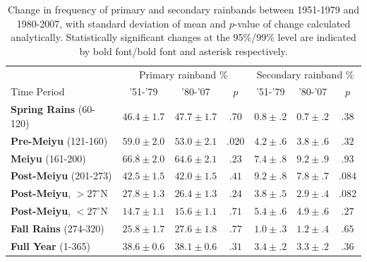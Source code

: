 \documentclass{ametsoc}
\begin{document}
\begin{table}

\centering

\caption{Change in frequency of primary and secondary rainbands between 1951-1979 and 1980-2007, with standard deviation of mean and $p$-value of change calculated analytically. Statistically significant changes at the 95\%/99\% level are indicated by bold font/bold font and asterisk respectively.}

\begin{tabular}{ l c c c c c c}
	& \multicolumn{3}{c}{Primary rainband \%} & \multicolumn{3}{c}{Secondary rainband \%} \\
	Time Period & '51-'79 & '80-'07 & $p$ & '51-'79 & '80-'07 & $p$ \\
	\hline	
	\textbf{Spring Rains} (60-120)		& $46.4 \pm 1.7$ & $47.7 \pm 1.7$ & $ .70 $ 	& $0.8 \pm .2$ & $0.7 \pm .2$ & $.38$ \\
	\textbf{Pre-Meiyu} (121-160) 		& $\boldsymbol{59.0 \pm 2.0}$ & $\boldsymbol{53.0 \pm 2.1}$ & $ \boldsymbol{.020} $ & $4.2 \pm .6$ & $3.8 \pm .6$ & $.32$ \\
	\textbf{Meiyu} (161-200)			& $66.8 \pm 2.0$ & $64.6 \pm 2.1$ & $ .23 $ 	& $7.4 \pm .8$ & $9.2 \pm .9$  & $.93$ \\
	\textbf{Post-Meiyu} (201-273)		& $42.5 \pm 1.5$ & $42.0 \pm 1.5$ & $ .41 $	& $9.2 \pm .8$ & $7.8 \pm .7$ & $.084$ \\
	\textbf{Post-Meiyu}, $>27^\circ$N 	& $27.8 \pm 1.3$ & $26.4 \pm 1.3$ & $ .24 $ 	& $3.8 \pm .5$ & $2.9 \pm .4$ & $.082$ \\
	\textbf{Post-Meiyu}, $<27^\circ$N 	& $14.7 \pm 1.1 $ & $15.6 \pm 1.1$ & $ .71 $ 	& $5.4 \pm .6$ & $4.9 \pm .6$ & $.27$  \\
	\textbf{Fall Rains} (274-320)			& $25.8 \pm 1.7 $ & $27.6 \pm 1.8$ & $ .77 $ 	& $1.0 \pm .3$ & $1.2 \pm .4$ & $.65$ \\
	\textbf{Full Year} (1-365)			& $38.6 \pm 0.6 $ & $38.1 \pm 0.6$ & $ .31 $ 	& $3.4 \pm .2$ & $3.3 \pm .2$ & $.36$ \\

\end{tabular}
\label{tab:t35}
\end{table}
\end{document}
